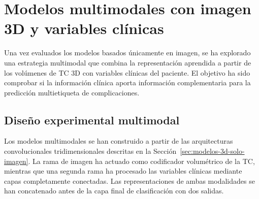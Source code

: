 

\section{Modelos multimodales con imagen 3D y variables clínicas}
\label{sec:modelos-multimodales-imagen-clinica}

Una vez evaluados los modelos basados únicamente en imagen, se ha explorado una estrategia multimodal que combina la representación aprendida a partir de los volúmenes de TC 3D con variables clínicas del paciente. El objetivo ha sido comprobar si la información clínica aporta información complementaria para la predicción multietiqueta de complicaciones.

\subsection{Diseño experimental multimodal}

Los modelos multimodales se han construido a partir de las arquitecturas convolucionales tridimensionales descritas en la Sección~\ref{sec:modelos-3d-solo-imagen}. La rama de imagen ha actuado como codificador volumétrico de la TC, mientras que una segunda rama ha procesado las variables clínicas mediante capas completamente conectadas. Las representaciones de ambas modalidades se han concatenado antes de la capa final de clasificación con dos salidas.

